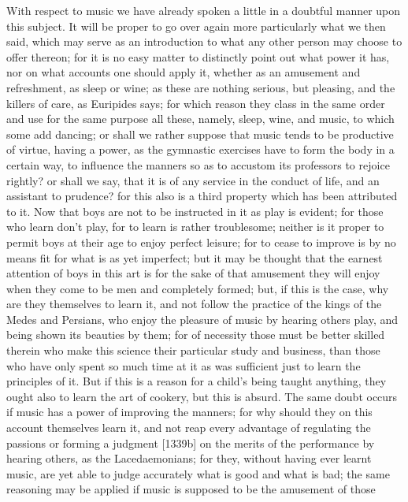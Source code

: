 
With respect to music we have already spoken a little in a doubtful manner
upon this subject. It will be proper to go over again more particularly
what we then said, which may serve as an introduction to what any other
person may choose to offer thereon; for it is no easy matter to distinctly
point out what power it has, nor on what accounts one should apply it,
whether as an amusement and refreshment, as sleep or wine; as these are
nothing serious, but pleasing, and the killers of care, as Euripides says;
for which reason they class in the same order and use for the same purpose
all these, namely, sleep, wine, and music, to which some add dancing; or
shall we rather suppose that music tends to be productive of virtue,
having a power, as the gymnastic exercises have to form the body in a
certain way, to influence the manners so as to accustom its professors to
rejoice rightly? or shall we say, that it is of any service in the conduct
of life, and an assistant to prudence? for this also is a third property
which has been attributed to it. Now that boys are not to be instructed in
it as play is evident; for those who learn don't play, for to learn is
rather troublesome; neither is it proper to permit boys at their age to
enjoy perfect leisure; for to cease to improve is by no means fit for what
is as yet imperfect; but it may be thought that the earnest attention of
boys in this art is for the sake of that amusement they will enjoy when
they come to be men and completely formed; but, if this is the case, why
are they themselves to learn it, and not follow the practice of the kings
of the Medes and Persians, who enjoy the pleasure of music by hearing
others play, and being shown its beauties by them; for of necessity those
must be better skilled therein who make this science their particular
study and business, than those who have only spent so much time at it as
was sufficient just to learn the principles of it. But if this is a reason
for a child's being taught anything, they ought also to learn the art of
cookery, but this is absurd. The same doubt occurs if music has a power of
improving the manners; for why should they on this account themselves
learn it, and not reap every advantage of regulating the passions or
forming a judgment [1339b] on the merits of the performance by hearing
others, as the Lacedaemonians; for they, without having ever learnt music,
are yet able to judge accurately what is good and what is bad; the same
reasoning may be applied if music is supposed to be the amusement of those

